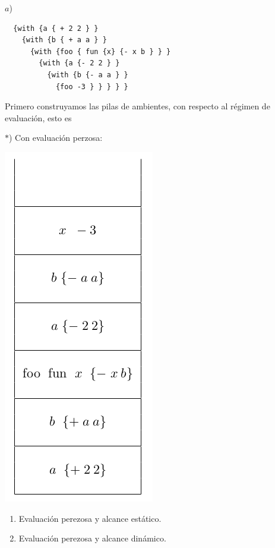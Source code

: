 $a$) \begin{lstlisting}
  {with {a { + 2 2 } }
    {with {b { + a a } }
      {with {foo { fun {x} {- x b } } }
        {with {a {- 2 2 } }
          {with {b {- a a } }
            {foo -3 } } } } }
\end{lstlisting} 

Primero construyamos las pilas de ambientes, con
respecto al régimen de evaluación, esto es

\begin{multicols}{2}    
  $*$) Con evaluación perzosa:
  \begin{center}
    \includegraphics[scale=0.40]{./Perezosa}
  \end{center}
  
  \begin{enumerate}
  \item Evaluación perezosa y alcance estático.
  \item Evaluación perezosa y alcance dinámico.
  \end{enumerate}
  

\end{multicols}
